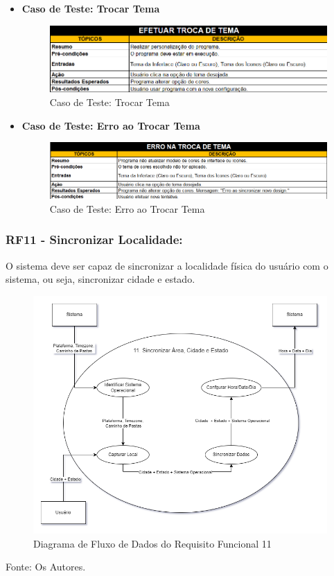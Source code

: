 \documentclass[a4paper,12pt]{article}
\begin{document}
\begin{itemize}
	\item\textbf{Caso de Teste: Trocar Tema}
	\begin{figure}
		\centering
		\includegraphics[scale=0.65]{UnitTest/trueCase/theme.png}
		\caption{Caso de Teste: Trocar Tema}
	\end{figure}
	\item\textbf{Caso de Teste: Erro ao Trocar Tema}
	\begin{figure}
		\centering
		\includegraphics[scale=0.65]{UnitTest/falseCase/theme.png}
		\caption{Caso de Teste: Erro ao Trocar Tema}
	\end{figure}
\end{itemize}

\pagebreak
\subsubsection{RF11 - Sincronizar Localidade:}
O sistema deve ser capaz de sincronizar a localidade física do usuário com o sistema, ou seja, sincronizar cidade e estado.
\begin{figure}[H]
	\centering
	\includegraphics[scale=0.45]{DFDs/RF11.drawio.png}
	\caption{Diagrama de Fluxo de Dados do Requisito Funcional 11}
\end{figure}
\noindent Fonte: Os Autores.
\end{document}
